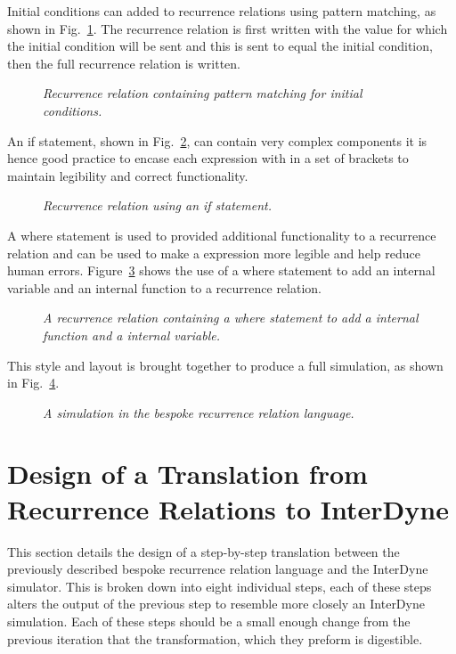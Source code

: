 \documentclass{article}
\begin{document}
Initial conditions can added to recurrence relations using pattern matching, as shown in Fig.~\ref{fig:5exofla}. The recurrence relation is first written with the value for which the initial condition will be sent and this is sent to equal the initial condition, then the full recurrence relation is written.  
\begin{figure}[H]
	\centering
	
	\caption{\it Recurrence relation containing pattern matching for initial conditions.}
	\label{fig:5exofla}
\end{figure} 
 
An if statement, shown in Fig.~\ref{fig:6exofla}, can contain very complex components it is hence good practice to encase each expression with in a set of brackets to maintain legibility and correct functionality.  
\begin{figure}[H]
	\centering
	
	\caption{\it Recurrence relation using an if statement.}
	\label{fig:6exofla}
\end{figure} 
 
A where statement is used to provided additional functionality to a recurrence relation and can be used to make a expression more legible and help reduce human errors. Figure~\ref{fig:7exofla} shows the use of a where statement to add an internal variable and an internal function to a recurrence relation. 
\begin{figure}[H]
	\centering
	
	\caption{\it A recurrence relation containing a where statement to add a internal function and a internal variable.}
	\label{fig:7exofla}
\end{figure} 

This style and layout is brought together to produce a full simulation, as shown in Fig.~\ref{fig:8exofla}.
\begin{figure}[H]
	\centering
	
	\caption{\it A simulation in the bespoke recurrence relation language.}
	\label{fig:8exofla}
\end{figure} 







\section{Design of a Translation from Recurrence Relations to InterDyne} 
This section details the design of a step-by-step translation between the previously described bespoke recurrence relation language and the InterDyne simulator. This is broken down into eight individual steps, each of these steps alters the output of the previous step to resemble more closely an InterDyne simulation. Each of these steps should be a small enough change from the previous iteration that the transformation, which they preform is digestible. 
\end{document}
